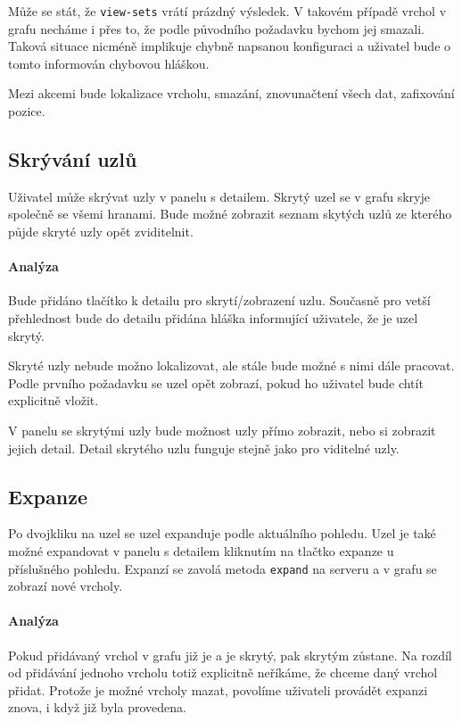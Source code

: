 Může se stát, že \texttt{view-sets} vrátí prázdný výsledek. V takovém případě vrchol v grafu necháme i přes to, že podle původního požadavku bychom jej smazali. Taková situace nicméně implikuje chybně napsanou konfiguraci a uživatel bude o tomto informován chybovou hláškou.

Mezi akcemi bude lokalizace vrcholu, smazání, znovunačtení všech dat, zafixování pozice.

\subsection*{Skrývání uzlů}
Uživatel může skrývat uzly v panelu s detailem. Skrytý uzel se v grafu skryje společně se všemi hranami. Bude možné zobrazit seznam skytých uzlů ze kterého půjde skryté uzly opět zviditelnit.

\paragraph{Analýza} Bude přidáno tlačítko k detailu pro skrytí/zobrazení uzlu. Současně pro vetší přehlednost bude do detailu přidána hláška informující uživatele, že je uzel skrytý.

Skryté uzly nebude možno lokalizovat, ale stále bude možné s nimi dále pracovat. Podle prvního požadavku se uzel opět zobrazí, pokud ho uživatel bude chtít explicitně vložit.

V panelu se skrytými uzly bude možnost uzly přímo zobrazit, nebo si zobrazit jejich detail. Detail skrytého uzlu funguje stejně jako pro viditelné uzly.

\subsection*{Expanze}
Po dvojkliku na uzel se uzel expanduje podle aktuálního pohledu. Uzel je také možné expandovat v panelu s detailem kliknutím na tlačtko expanze u příslušného pohledu. Expanzí se zavolá metoda \texttt{expand} na serveru a v grafu se zobrazí nové vrcholy.

\paragraph{Analýza} Pokud přidávaný vrchol v grafu již je a je skrytý, pak skrytým zůstane. Na rozdíl od přidávání jednoho vrcholu totiž explicitně neříkáme, že chceme daný vrchol přidat. Protože je možné vrcholy mazat, povolíme uživateli provádět expanzi znova, i když již byla provedena.

